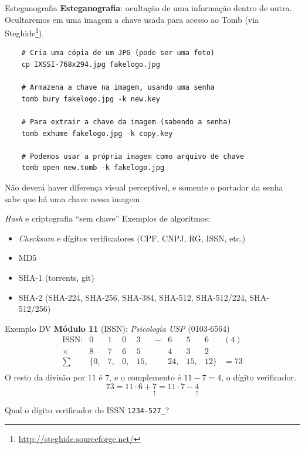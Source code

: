 \documentclass[utf8]{beamer}
\newcommand{\challengeFive}[0]{1234-527\_}
\begin{document}
\begin{frame}[fragile]{Esteganografia}
  \textbf{Esteganografia}: ocultação de uma informação dentro de outra.
  Ocultaremos em uma imagem a chave usada
  para acesso ao Tomb (via Steghide\footnote{
    \url{http://steghide.sourceforge.net/}
  }).
  \vfill
  \begin{verbatim}
    # Cria uma cópia de um JPG (pode ser uma foto)
    cp IXSSI-768x294.jpg fakelogo.jpg

    # Armazena a chave na imagem, usando uma senha
    tomb bury fakelogo.jpg -k new.key

    # Para extrair a chave da imagem (sabendo a senha)
    tomb exhume fakelogo.jpg -k copy.key

    # Podemos usar a própria imagem como arquivo de chave
    tomb open new.tomb -k fakelogo.jpg
  \end{verbatim}
  \vfill
  Não deverá haver diferença visual perceptível,
  e somente o portador da senha sabe que há uma chave nessa imagem.
\end{frame}


\begin{frame}{\emph{Hash} e criptografia ``sem chave''}
  Exemplos de algoritmos:
  \begin{itemize}
    \item \emph{Checksum} e dígitos verificadores
          (CPF, CNPJ, RG, ISSN, etc.)
    \item MD5
    \item SHA-1 (torrents, git)
    \item SHA-2 (SHA-224, SHA-256, SHA-384, SHA-512,
                 SHA-512/224, SHA-512/256)
  \end{itemize}
  \vspace{.5em}
  \vfill
  Exemplo DV \textbf{Módulo 11} (ISSN):
  \emph{Psicologia USP} (0103-6564)
  \[
  \begin{array}{rccccccccl}
    \text{ISSN:} &  0 &  1 &  0 &  3 & - &  6 &  5 &  6 & (4) \\
          \times &  8 &  7 &  6 &  5 &   &  4 &  3 &  2 \\ \hline
          \sum & \{ 0,&  7,&  0,& 15,&   & 24,& 15,& 12 \} & = 73 \\
  \end{array}
  \]
  O resto da divisão por $11$ é $7$, e o complemento é $11 - 7 = 4$,
  o dígito verificador.
  \[
  73 = 11 \cdot 6 + {\underset{\uparrow}{7}} =
       11 \cdot 7 - {\underset{\uparrow}{4}}
  \]
  \begin{center}\Large
    Qual o dígito verificador do ISSN \texttt{\challengeFive}?
  \end{center}
\end{frame}
\end{document}

